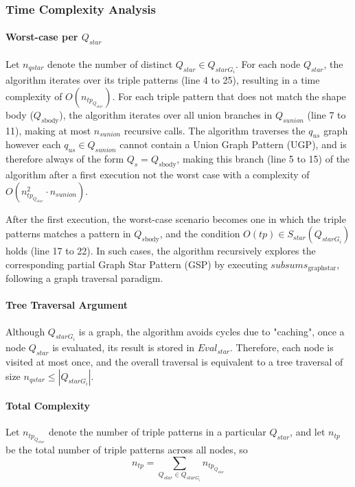 \subsubsection{Time Complexity Analysis}

\paragraph{Worst-case per $Q_{star}$}
Let $n_{qstar}$ denote the number of distinct $Q_{star} \in Q_{starG_i}$.
For each node $Q_{star}$, the algorithm iterates over its triple patterns (line 4 to 25), resulting in a time complexity of $O(n_{tp_{Q_{star}}})$.
For each triple pattern that does not match the shape body ($Q_{s\mathrm{body}}$), the algorithm iterates over all union branches in $Q_{sunion}$ (line 7 to 11), making at most $n_{sunion}$ recursive calls.
The algorithm traverses the $q_{us}$ graph however each $q_{us} \in Q_{sunion}$ cannot contain a Union Graph Pattern (UGP), and is therefore always of the form $Q_s = Q_{s\mathrm{body}}$, making this 
branch (line 5 to 15) of the algorithm after a first execution not the worst case with a complexity of $O(n_{tp_{Q_{star}}}^{2} \cdot n_{sunion})$.

After the first execution, the worst-case scenario becomes one in which the triple patterns matches a pattern in $Q_{s\mathrm{body}}$, and the condition $O(tp) \in S_{star}(Q_{starG_i})$ holds (line 17 to 22).
In such cases, the algorithm recursively explores the corresponding partial Graph Star Pattern (GSP) by executing $subsums_{\mathrm{graph star}}$, following a graph traversal paradigm.


\paragraph{Tree Traversal Argument}
Although $Q_{starG_i}$ is a graph, the algorithm avoids cycles due to "caching", once a node $Q_{star}$ is evaluated, its result is stored in $Eval_{star}$.
Therefore, each node is visited at most once, and the overall traversal is equivalent to a tree traversal of size $n_{qstar} \leq |Q_{starG_i}|$.

\paragraph{Total Complexity}
Let $n_{tp_{Q_{star}}}$ denote the number of triple patterns in a particular $Q_{star}$, and let $n_{tp}$ be the total number of triple patterns across all nodes, so
$$
n_{tp} = \sum_{Q_{star} \in Q_{starG_i}} n_{tp_{Q_{star}}}
$$

